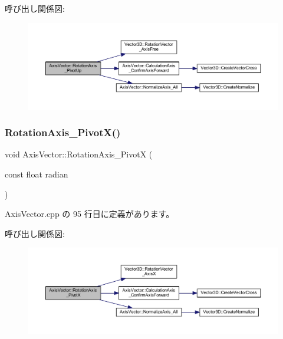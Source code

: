 呼び出し関係図\+:
\nopagebreak
\begin{figure}[H]
\begin{center}
\leavevmode
\includegraphics[width=350pt]{class_axis_vector_ad33eef7f1b3912b6a1d0eaa18fff8f29_cgraph}
\end{center}
\end{figure}
\mbox{\label{class_axis_vector_ad3110d0a45e303109caa1e0dfb2ca027}} 
\subsubsection{\texorpdfstring{Rotation\+Axis\+\_\+\+Pivot\+X()}{RotationAxis\_PivotX()}}
{\footnotesize\ttfamily void Axis\+Vector\+::\+Rotation\+Axis\+\_\+\+PivotX (\begin{DoxyParamCaption}\item[{const float}]{radian }\end{DoxyParamCaption})}



 Axis\+Vector.\+cpp の 95 行目に定義があります。

呼び出し関係図\+:
\nopagebreak
\begin{figure}[H]
\begin{center}
\leavevmode
\includegraphics[width=350pt]{class_axis_vector_ad3110d0a45e303109caa1e0dfb2ca027_cgraph}
\end{center}
\end{figure}
\mbox{\label{class_axis_vector_aee4198c9fcf78d6912b129e2210a58fa}} 
